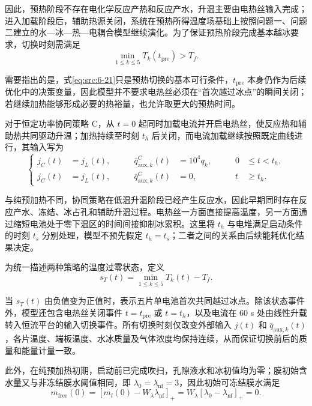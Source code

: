 \documentclass[bwprint]{gmcmthesis}
\numberwithin{equation}{section}
\numberwithin{figure}{section}
\begin{document}
 因此，预热阶段不存在电化学反应产热和反应产水，升温主要由电热丝输入完成；进入加载阶段后，辅助热源关闭，系统在预热所得温度场基础上按照问题一、问题二建立的水—冰—热—电耦合模型继续演化。为了保证预热阶段完成基本越冰要求，切换时刻需满足
\begin{equation}
\min_{1 \leq k \leq 5} T_k(t_{\text{pre}}) > T_f. \label{eq:src:6-21}
\end{equation}

 需要指出的是，式\eqref{eq:src:6-21}只是预热切换的基本可行条件，\(t_{\text{pre}}\) 本身仍作为后续优化中的决策变量，因此模型并不要求电热丝必须在“首次越过冰点”的瞬间关闭；若继续加热能够形成必要的热裕量，也允许取更大的预热时间。

 对于恒定功率协同策略 C，从 \(t = 0\) 起同时加载电流并开启电热丝，使反应热和辅助热共同驱动升温；加热持续至时刻 \(t_h\) 后关闭，而电流加载继续按照既定曲线进行，其输入写为
\begin{equation}
\left\{
\begin{aligned}
j_C(t) &= j_L(t), \qquad & \bar{q}_{\text{aux},k}^C(t) &= 10^4 q_k, \qquad & 0 &\leq t < t_h, \\
j_C(t) &= j_L(t), \qquad & \bar{q}_{\text{aux},k}^C(t) &= 0, \qquad & t &\geq t_h.
\end{aligned}
\right.
\label{eq:src:6-22}
\end{equation}

 与纯预加热不同，协同策略在低温升温阶段已经产生反应水，因此早期同时存在反应产水、冻结、冰占孔和辅助升温过程。电热丝一方面直接提高温度，另一方面通过缩短电池处于零下温区的时间间接抑制冰累积。这里将 \(t_h\) 与电堆满足启动条件的时刻 \(t_s\) 分别处理，模型不预先假定 \(t_h = t_s\)；二者之间的关系由后续能耗优化结果决定。

 为统一描述两种策略的温度过零状态，定义
\begin{equation}
s_T(t) = \min_{1 \leq k \leq 5} T_k(t)-T_f. \label{eq:src:6-23}
\end{equation}

 当 \(s_T(t)\) 由负值变为正值时，表示五片单电池首次共同越过冰点。除该状态事件外，模型还包含电热丝关闭事件 \(t = t_{\text{pre}}\) 或 \(t = t_h\)，以及电流在 60 s 处由线性升载转入恒流平台的输入切换事件。所有切换时刻仅改变外部输入 \(j(t)\) 和 \(\bar{q}_{\text{aux},k}(t)\)，各片温度、端板温度、水冰质量及气体浓度均保持连续，从而保证切换前后的质量和能量计量一致。

 此外，在纯预加热初期，启动前已完成吹扫，孔隙液水和冰初值均为零；膜初始含水量又与非冻结膜水阈值相同，即 \(\lambda_0 = \lambda_{\text{nf}} = 3\)，因此初始可冻结膜水满足
\begin{equation}
m_{\text{free}}(0) = [m_l(0) - W_\lambda \lambda_{\text{nf}}]_+ = W_\lambda [\lambda_0 - \lambda_{\text{nf}}]_+ = 0. \label{eq:src:6-24}
\end{equation}
\end{document}
